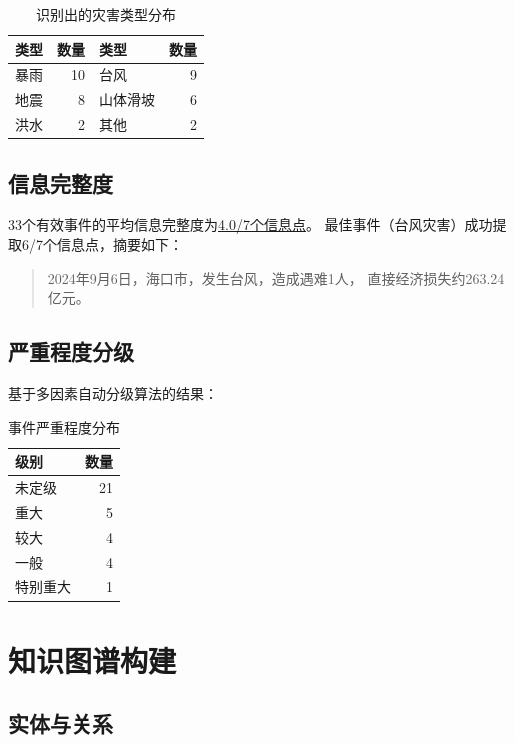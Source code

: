 \documentclass[12pt,a4paper]{ctexart}
\begin{document}
\begin{table}[h]
\centering
\caption{识别出的灾害类型分布}
\begin{tabular}{lr|lr}
\toprule
类型 & 数量 & 类型 & 数量 \\
\midrule
暴雨 & 10 & 台风 & 9 \\
地震 & 8 & 山体滑坡 & 6 \\
洪水 & 2 & 其他 & 2 \\
\bottomrule
\end{tabular}
\end{table}

\subsection{信息完整度}

33个有效事件的平均信息完整度为\underline{4.0/7个信息点}。
最佳事件（台风灾害）成功提取6/7个信息点，摘要如下：

\begin{quote}
2024年9月6日，海口市，发生台风，造成遇难1人，
直接经济损失约263.24亿元。
\end{quote}

\subsection{严重程度分级}

基于多因素自动分级算法的结果：

\begin{table}[h]
\centering
\caption{事件严重程度分布}
\begin{tabular}{lr}
\toprule
级别 & 数量 \\
\midrule
未定级 & 21 \\
重大 & 5 \\
较大 & 4 \\
一般 & 4 \\
特别重大 & 1 \\
\bottomrule
\end{tabular}
\end{table}

\section{知识图谱构建}

\subsection{实体与关系}
\end{document}
